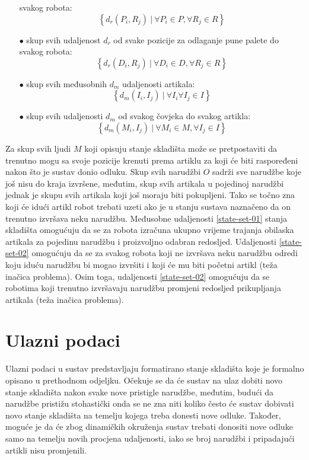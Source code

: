 \documentclass[times, utf8, seminar]{fer}
\begin{document}
\begin{itemize}
                     svakog robota:
                \begin{equation}
                    \left\{d_r(P_i, R_j)\ |\ \forall P_i \in P, \forall R_j \in R\right\}
                \end{equation}
    \item[$\bullet$] skup svih udaljenost $d_r$ od svake pozicije za odlaganje pune palete do
                     svakog robota:
                \begin{equation}
                    \left\{d_r(D_i, R_j)\ |\ \forall D_i \in D, \forall R_j \in R\right\}
                \end{equation}
    \item[$\bullet$] skup svih međusobnih $d_m$ udaljenosti artikala:
                \begin{equation}
                    \left\{d_m(I_i, I_j)\ |\ \forall I_i \forall I_j \in I\right\}
                \end{equation}
    \item[$\bullet$] skup svih udaljenosti $d_m$ od svakog čovjeka do svakog artikla:
                \begin{equation}
                    \left\{d_m(M_i, I_j)\ |\ \forall M_i \in M, \forall I_j \in I\right\}
                \end{equation}
\end{itemize}

Za skup svih ljudi $M$ koji opisuju stanje skladišta može se pretpostaviti da trenutno mogu
sa svoje pozicije krenuti prema artiklu za koji će biti raspoređeni nakon što je sustav
donio odluku. Skup svih narudžbi $O$ sadrži sve narudžbe koje još nisu do kraja izvršene,
međutim, skup svih artikala u pojedinoj narudžbi jednak je skupu svih artikala
koji još moraju biti pokupljeni. Tako se točno zna koji će idući artikl robot trebati
uzeti ako je u stanju sustava naznačeno da on trenutno izvršava neku narudžbu. Međusobne
udaljenosti \ref{state-set-01} stanja skladišta omogućuju da se za robota izračuna ukupno vrijeme
trajanja obilaska artikala za pojedinu narudžbu i proizvoljno odabran redosljed. Udaljenosti
\ref{state-set-02} omogućuju da se za svakog robota koji ne izvršava neku narudžbu odredi
koju iduću narudžbu bi mogao izvršiti i koji će mu biti početni artikl (teža inačica problema).
Osim toga, udaljenosti \ref{state-set-02} omogućuju da se robotima koji trenutno izvršavaju
narudžbu promjeni redosljed prikupljanja artikala (teža inačica problema).

\section{Ulazni podaci}
Ulazni podaci u sustav predstavljaju formatirano stanje skladišta koje je formalno opisano u prethodnom odjeljku.
Očekuje se da će sustav na ulaz dobiti novo stanje skladišta nakon svake nove pristigle narudžbe, međutim,
budući da narudžbe pristižu stohastički onda se ne zna niti koliko često će sustav dobivati
novo stanje skladišta na temelju kojega treba donesti nove odluke. Također, moguće je da će zbog
dinamičkih okruženja sustav trebati donositi nove odluke samo na temelju novih procjena udaljenosti, iako
se broj narudžbi i pripadajući artikli nisu promjenili.
\end{document}
